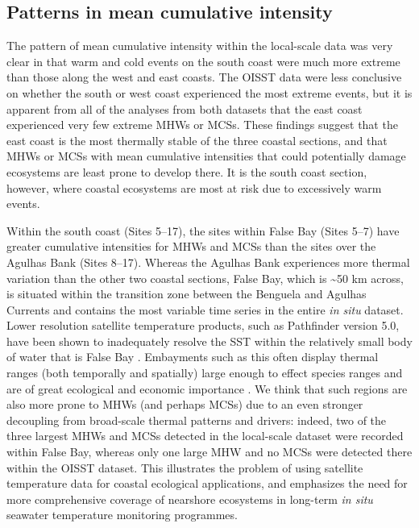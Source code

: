\documentclass[a4paper,10pt,review]{elsarticle}
\begin{document}
\subsection{Patterns in mean cumulative intensity}
The pattern of mean cumulative intensity within the local-scale data was very clear in that warm and cold events on the south coast were much more extreme than those along the west and east coasts. The OISST data were less conclusive on whether the south or west coast experienced the most extreme events, but it is apparent from all of the analyses from both datasets that the east coast experienced very few extreme MHWs or MCSs. These findings suggest that the east coast is the most thermally stable of the three coastal sections, and that MHWs or MCSs with mean cumulative intensities that could potentially damage ecosystems are least prone to develop there. It is the south coast section, however, where coastal ecosystems are most at risk due to excessively warm events.

Within the south coast (Sites 5--17), the sites within False Bay (Sites 5--7) have greater cumulative intensities for MHWs and MCSs than the sites over the Agulhas Bank (Sites 8--17). Whereas the Agulhas Bank experiences more thermal variation than the other two coastal sections, False Bay, which is \textasciitilde50 km across, is situated within the transition zone between the Benguela and Agulhas Currents \citep{Smit2013} and contains the most variable time series in the entire \emph{in situ} dataset. Lower resolution satellite temperature products, such as Pathfinder version 5.0, have been shown to inadequately resolve the SST within the relatively small body of water that is False Bay \citep{Dufois2012}. Embayments such as this often display thermal ranges (both temporally and spatially) large enough to effect species ranges \citep{Ling2009} and are of great ecological \citep{Klumb2003} and economic importance \citep{Lugendo2005}. We think that such regions are also more prone to MHWs (and perhaps MCSs) due to an even stronger decoupling from broad-scale thermal patterns and drivers: indeed, two of the three largest MHWs and MCSs detected in the local-scale dataset were recorded within False Bay, whereas only one large MHW and no MCSs were detected there within the OISST dataset. This illustrates the problem of using satellite temperature data for coastal ecological applications, and emphasizes the need for more comprehensive coverage of nearshore ecosystems in long-term \emph{in situ} seawater temperature monitoring programmes.
\end{document}
